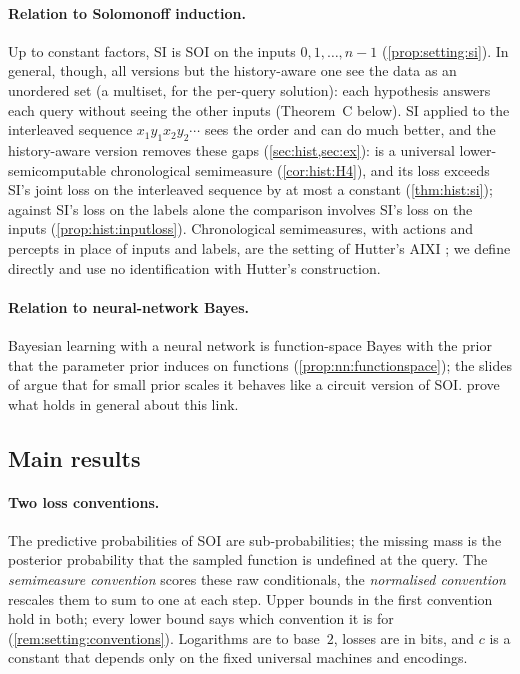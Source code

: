 \paragraph{Relation to Solomonoff induction.} Up to constant factors, SI is SOI on the inputs $0,1,\dots,n-1$ (\cref{prop:setting:si}). In general, though, all versions but the history-aware one see the data as an unordered set (a multiset, for the per-query solution): each hypothesis answers each query without seeing the other inputs (Theorem~C below). SI applied to the interleaved sequence $x_1y_1x_2y_2\cdots$ sees the order and can do much better, and the history-aware version removes these gaps (\cref{sec:hist,sec:ex}): \SFIhist{} is a universal lower-semicomputable chronological semimeasure (\cref{cor:hist:H4}), and its loss exceeds SI's joint loss on the interleaved sequence by at most a constant (\cref{thm:hist:si}); against SI's loss on the labels alone the comparison involves SI's loss on the inputs (\cref{prop:hist:inputloss}). Chronological semimeasures, with actions and percepts in place of inputs and labels, are the setting of Hutter's AIXI \citep{hutter2000theory,hutter2005universal}; we define \SFIhist{} directly and use no identification with Hutter's construction.

\paragraph{Relation to neural-network Bayes.} Bayesian learning with a neural network is function-space Bayes with the prior that the parameter prior induces on functions (\cref{prop:nn:functionspace}); the slides of \citet{vaintrobhanni2026nnbayes} argue that for small prior scales it behaves like a circuit version of SOI.  prove what holds in general about this link.

\subsection{Main results}\label{sec:intro:results}

\paragraph{Two loss conventions.} The predictive probabilities of SOI are sub-probabilities; the missing mass is the posterior probability that the sampled function is undefined at the query. The \emph{semimeasure convention} scores these raw conditionals, the \emph{normalised convention} rescales them to sum to one at each step. Upper bounds in the first convention hold in both; every lower bound says which convention it is for (\cref{rem:setting:conventions}). Logarithms are to base~$2$, losses are in bits, and $c$ is a constant that depends only on the fixed universal machines and encodings.

